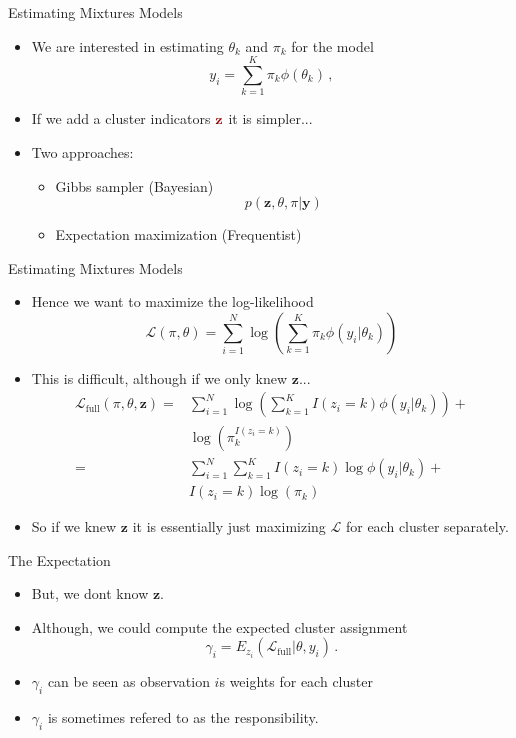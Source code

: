 \documentclass[10pt]{beamer}
\begin{document}
\begin{frame}{Estimating Mixtures Models}

\begin{itemize}
\item We are interested in estimating $\theta_k$ and $\pi_k$ for the model
\[
y_i = \sum_{k=1}^K \pi_k \phi(\theta_k)\,,
\]
\item If we add a cluster indicators $\uured{\mathbf{z}}$ it is simpler...
\pause
\item Two approaches:
  \begin{itemize}
  \item Gibbs sampler (Bayesian)
  \[
  p(\mathbf{z}, \theta, \pi|\mathbf{y})
  \]
  \pause
  \item Expectation maximization (Frequentist)
\end{itemize}
\end{itemize}


\end{frame}


\begin{frame}{Estimating Mixtures Models}

\begin{itemize}
\item Hence we want to maximize the log-likelihood
\[
\mathcal{L}(\pi, \theta) = \sum^N_{i=1} \log \left( \sum_{k=1}^K \pi_k \phi(y_i|\theta_k)\right)
\]
\item This is difficult, although {\color{uured} if we only knew $\mathbf{z}$}...\pause
\begin{align*}
\mathcal{L}_{\text{full}}(\pi, \theta, \mathbf{z}) =& \sum^N_{i=1} \log \left( \sum_{k=1}^K I(z_i=k) \phi(y_i|\theta_k)\right) + \\
& \log(\pi_k^{I(z_i=k)})\\
=& \sum^N_{i=1} \sum_{k=1}^K I(z_i=k) \log \phi(y_i|\theta_k) + \\
& I(z_i=k) \log(\pi_k)
\end{align*}
\item So if we knew $\mathbf{z}$ it is essentially just maximizing $\mathcal{L}$ for each cluster separately.

\end{itemize}

\end{frame}


\begin{frame}{The Expectation}

\begin{itemize}
\item But, we dont know $\mathbf{z}$.\pause
\item Although, we could compute the {\color{uured} expected} cluster assignment
\[
\gamma_{i} = E_{z_i} (\mathcal{L}_{\text{full}}|\theta, y_i)\,.
\]
\pause
\item $\gamma_{i}$ can be seen as observation $i$s {\color{uured} weights} for each cluster
\pause
\item $\gamma_{i}$ is sometimes refered to as the {\color{uured} responsibility}.
\end{itemize}

\end{frame}
\end{document}
